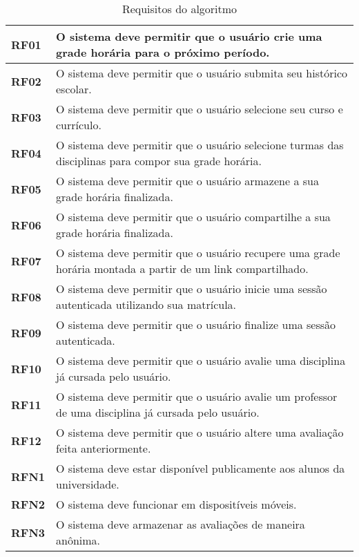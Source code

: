 \begin{table}[!ht]
    \begin{center}
        \begin{tabular}{ | m{} | p{} | }  
            \hline
            \textbf{RF01} & O sistema deve permitir que o usuário crie uma grade horária para o próximo período.\tabularnewline\hline
            \textbf{RF02} & O sistema deve permitir que o usuário submita seu histórico escolar.\tabularnewline\hline
            \textbf{RF03} & O sistema deve permitir que o usuário selecione seu curso e currículo.\tabularnewline\hline
            \textbf{RF04} & O sistema deve permitir que o usuário selecione turmas das disciplinas para compor sua grade horária.\tabularnewline\hline
            \textbf{RF05} & O sistema deve permitir que o usuário armazene a sua grade horária finalizada.\tabularnewline\hline
            \textbf{RF06} & O sistema deve permitir que o usuário compartilhe a sua grade horária finalizada. \tabularnewline\hline
            \textbf{RF07} & O sistema deve permitir que o usuário recupere uma grade horária montada a partir de um link compartilhado.\tabularnewline\hline
            
            
            \textbf{RF08} & O sistema deve permitir que o usuário inicie uma sessão autenticada utilizando sua matrícula.\tabularnewline\hline
            \textbf{RF09} & O sistema deve permitir que o usuário finalize uma sessão autenticada.\tabularnewline\hline
            \textbf{RF10} & O sistema deve permitir que o usuário avalie uma disciplina já cursada pelo usuário.\tabularnewline\hline
            \textbf{RF11} & O sistema deve permitir que o usuário avalie um professor de uma disciplina já cursada pelo usuário.\tabularnewline\hline
            \textbf{RF12} & O sistema deve permitir que o usuário altere uma avaliação feita anteriormente.\tabularnewline\hline


            \textbf{RFN1} & O sistema deve estar disponível publicamente aos alunos da universidade.\tabularnewline\hline
            \textbf{RFN2} & O sistema deve funcionar em dispositíveis móveis.\tabularnewline\hline
            \textbf{RFN3} & O sistema deve armazenar as avaliações de maneira anônima.\tabularnewline\hline
        
        
        \end{tabular}
    \end{center}
    \caption{Requisitos do algoritmo}
    
    \label{tab:req-sistema}
\end{table}

